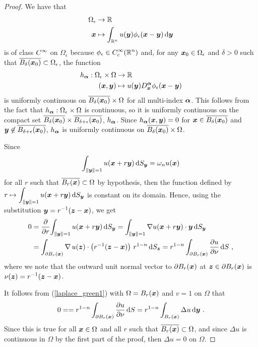 \begin{proof}
We have that
\begin{align*}
\Omega_\epsilon & \rightarrow \RR \\
\VEC{x} & \mapsto
\int_{\RR^n} u(\VEC{y}) \phi_\epsilon(\VEC{x}-\VEC{y}) \dx{\VEC{y}}
\end{align*}
is of class $\DS C^\infty$ on $\Omega_\epsilon$ because
$\DS \phi_\epsilon \in C_c^\infty(\RR^n)$ and, for any
$\VEC{x}_0 \in \Omega_\epsilon$ and $\delta>0$ such that
$\overline{B_\delta(\VEC{x}_0)} \subset \Omega_\epsilon$, the function
\begin{align*}
h_{\VEC{\alpha}}: \Omega_\epsilon \times \Omega &\rightarrow \RR \\
(\VEC{x},\VEC{y}) &\mapsto u(\VEC{y})D^{\VEC{\alpha}}_{\VEC{x}}
\phi_\epsilon(\VEC{x}-\VEC{y})
\end{align*}
is uniformly continuous on
$\overline{B_\delta(\VEC{x}_0)} \times \Omega$ for all
multi-index $\VEC{\alpha}$.  This follows from the
fact that $h_{\VEC{\alpha}}:\Omega_\epsilon \times \Omega$ is
continuous, so it is uniformly continuous on the compact set
$\DS \overline{B_\delta(\VEC{x}_0)} \times
\overline{B_{\delta+\epsilon}(\VEC{x}_0)}$, $h_{\VEC{\alpha}}$.  Since
$h_{\VEC{\alpha}}(\VEC{x},\VEC{y}) = 0$ for
$\VEC{x} \in \overline{B_{\delta}(\VEC{x}_0)}$ and
$\VEC{y} \not\in \overline{B_{\delta+\epsilon}(\VEC{x}_0)}$,
$h_{\VEC{\alpha}}$ is uniformly continuous on
$\overline{B_\delta(\VEC{x}_0)} \times \Omega$.

 Since
\[
\int_{\|\VEC{y}\|=1} u(\VEC{x}+r\VEC{y}) \dss{S}{y} = \omega_n u(\VEC{x})
\]
for all $r$ such that $\overline{B_r(\VEC{x})} \subset \Omega$ by hypothesis,
then the function defined by\\
$\DS r \mapsto \int_{\|\VEC{y}\|=1} u(\VEC{x}+r\VEC{y}) \dss{S}{y}$
is constant on its domain.  Hence, using the substitution
$\DS \VEC{y} = r^{-1} (\VEC{z}-\VEC{x})$, we get
\begin{align*}
0 &= \pdfdx{ \int_{\|\VEC{y}\|=1} u(\VEC{x}+r\VEC{y}) \dss{S}{y} }{r}
= \int_{\|\VEC{y}\|=1} \nabla u(\VEC{x}+r\VEC{y}) \cdot \VEC{y}
 \dss{S}{y} \\
&= \int_{\partial B_r(\VEC{x})} \graD u(\VEC{z}) \cdot \left(
  r^{-1} (\VEC{z} - \VEC{x}) \right) \, r^{1-n} \dss{S}{z}
= r^{1-n} \int_{\partial B_r(\VEC{x})} \pdydx{u}{\nu} \dx{S} \ ,
\end{align*}
where we note that the outward unit normal vector to $\partial B_r(\VEC{x})$
at $\VEC{z} \in \partial B_r(\VEC{x})$ is
$\DS \nu(\VEC{z}) = r^{-1}(\VEC{z}-\VEC{x})$.

It follows from (\ref{laplace_green1}) with $\Omega = B_r(\VEC{x})$
and $v=1$ on $\Omega$ that
\[
0 = = r^{1-n} \int_{\partial B_r(\VEC{x})} \pdydx{u}{\nu} \dx{S}
= r^{1-n} \int_{B_r(\VEC{x})} \Delta u \dx{\VEC{y}} \ .
\]
Since this is true for all $\VEC{x} \in \Omega$ and
all $r$ such that $\overline{B_r(\VEC{x})} \subset \Omega$, and since
$\Delta u$ is continuous in $\Omega$ by the first part of the proof, then
$\Delta u = 0$ on $\Omega$.
\end{proof}

